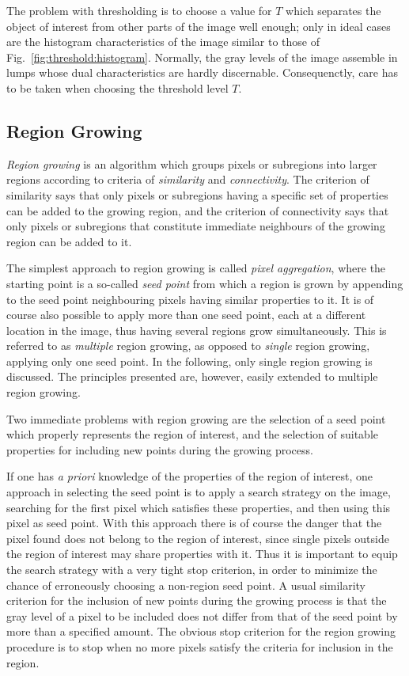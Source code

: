 The problem with thresholding is to choose a value for $T$ which
separates the object of interest from other parts of the image well
enough; only in ideal cases are the histogram characteristics of the
image similar to those of Fig.~\ref{fig:threshold:histogram}.
Normally, the gray levels of the image assemble in lumps whose dual
characteristics are hardly discernable.  Consequenctly, care has to be
taken when choosing the threshold level $T$.

\subsection{Region Growing}
\label{image:segment:region}

{\em Region growing\/} is an algorithm which groups pixels or
subregions into larger regions according to criteria of {\em
  similarity\/} and {\em connectivity\/}.  The criterion of similarity
says that only pixels or subregions having a specific set of
properties can be added to the growing region, and the criterion of
connectivity says that only pixels or subregions that constitute
immediate neighbours of the growing region can be added to it.

The simplest approach to region growing is called {\em pixel
  aggregation\/}, where the starting point is a so-called {\em seed
  point\/} from which a region is grown by appending to the seed point
neighbouring pixels having similar properties to it.  It is of course
also possible to apply more than one seed point, each at a different
location in the image, thus having several regions grow
simultaneously.  This is referred to as {\em multiple\/} region
growing, as opposed to {\em single\/} region growing, applying only
one seed point.  In the following, only single region growing is
discussed.  The principles presented are, however, easily extended to
multiple region growing.

Two immediate problems with region growing are the selection of a seed
point which properly represents the region of interest, and the
selection of suitable properties for including new points during the
growing process.  

If one has {\em a priori\/} knowledge of the properties of the region
of interest, one approach in selecting the seed point is to apply a
search strategy on the image, searching for the first pixel which
satisfies these properties, and then using this pixel as seed point.
With this approach there is of course the danger that the pixel found
does not belong to the region of interest, since single pixels outside
the region of interest may share properties with it.  Thus it is
important to equip the search strategy with a very tight stop
criterion, in order to minimize the chance of erroneously choosing a
non-region seed point.  A usual similarity criterion for the inclusion
of new points during the growing process is that the gray level of a
pixel to be included does not differ from that of the seed point by
more than a specified amount.  The obvious stop criterion for the
region growing procedure is to stop when no more pixels satisfy the
criteria for inclusion in the region.

